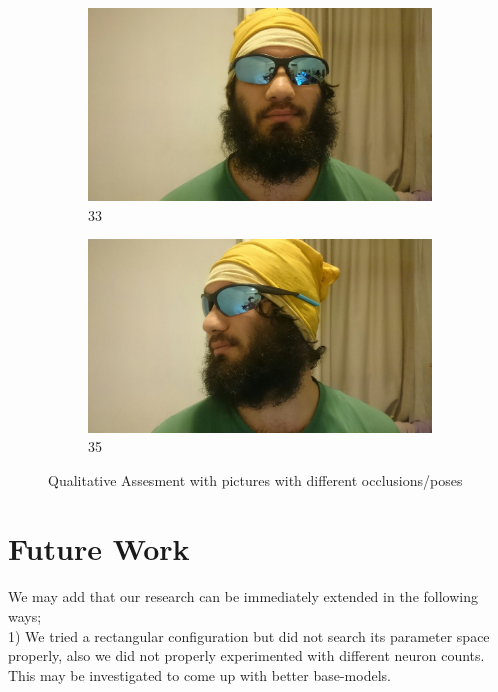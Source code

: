 \documentclass[conference,compsoc]{IEEEtran}
\begin{document}
\begin{figure}[h!]
  \centering
  \begin{subfigure}[b]{0.4\linewidth}
    \includegraphics[width=\linewidth]{77.jpeg}
    \caption{33}
  \end{subfigure}
  \begin{subfigure}[b]{0.4\linewidth}
    \includegraphics[width=\linewidth]{88.jpeg}
    \caption{35}
  \end{subfigure}
  \caption{Qualitative Assesment with pictures with different occlusions/poses }

\end{figure}

\section{Future Work}
We may add that our research can be immediately extended in the following ways; \\

1) We tried a rectangular configuration but did not search its parameter space properly, also we did not properly experimented with different neuron counts. This may be investigated to come up with better base-models. \\
\end{document}
